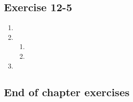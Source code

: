 \subsection{Exercise 12-5} %
\begin{enumerate}[noitemsep, label=\textbf{\arabic*}. ] 
 \item %
\item %
\begin{enumerate}[noitemsep, label=\textbf{(\alph*)} ] 
\item %
\item %
\end{enumerate}
\item %
\end{enumerate}
% 

\subsection{End of chapter exercises} %

